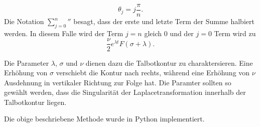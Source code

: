 \[
\theta_{j} = j \frac{\pi}{n}.
\]
Die Notation ${\sum_{j=0}^n}''$ besagt, dass der erste und letzte
Term der Summe halbiert werden.
In diesem Falle wird der Term $j=n$ gleich 0 und der $j=0$ Term wird zu
\[
\frac{\nu}{2}e^{\lambda t}F(\sigma + \lambda).
\]

Die Parameter $\lambda$, $\sigma$ und $\nu$ dienen dazu die
Talbotkontur zu charaktersieren. Eine Erhöhung von $\sigma$ verschiebt
die Kontur nach rechts, während eine Erhöhung von $\nu$ Ausdehnung
in vertikaler Richtung zur Folge hat. Die Paramter sollten so gewählt
werden, dass die Singularität der Laplacetransformation innerhalb
der Talbotkontur liegen.

Die obige beschriebene Methode wurde in Python implementiert.

